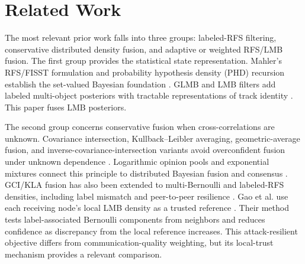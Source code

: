 \section{Related Work}
\label{sec:related-work}

The most relevant prior work falls into three groups: labeled-RFS filtering, conservative distributed density fusion, and adaptive or weighted RFS/LMB fusion. The first group provides the statistical state representation. Mahler's RFS/FISST formulation and probability hypothesis density (PHD) recursion establish the set-valued Bayesian foundation \cite{Mahler2003PHD,Mahler2007FISSTBook,VoMa2006GMPHD}. GLMB and LMB filters add labeled multi-object posteriors with tractable representations of track identity \cite{Vo2014LRFS,Reuter2014LMB,Vo2019MSGLMB,Mahler2019ExactBayes,Vo2024OverviewLRFS}. This paper fuses LMB posteriors.

The second group concerns conservative fusion when cross-correlations are unknown. Covariance intersection, Kullback--Leibler averaging, geometric-average fusion, and inverse-covariance-intersection variants avoid overconfident fusion under unknown dependence \cite{JulierUhlmann1997CI,Mahler2000RobustFusion,Battistelli2014KLA,Hlinka2014ICI,Uhlmann2003CovarianceConsistency,Noack2017ICI,Zhang2020OptimalFusion}. Logarithmic opinion pools and exponential mixtures connect this principle to distributed Bayesian fusion and consensus \cite{Uney2013EMDPHD,Bandyopadhyay2018LogOP}. GCI/KLA fusion has also been extended to multi-Bernoulli and labeled-RFS densities, including label mismatch and peer-to-peer resilience \cite{Wang2017MBGCI,Li2018RobustDistributedLRFS,Gao2023ResilientLMB}. Gao et al. use each receiving node's local LMB density as a trusted reference \cite{Gao2023ResilientLMB}. Their method tests label-associated Bernoulli components from neighbors and reduces confidence as discrepancy from the local reference increases. This attack-resilient objective differs from communication-quality weighting, but its local-trust mechanism provides a relevant comparison.

